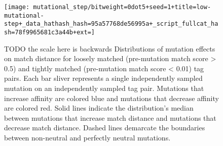 \begin{figure}
\begin{center}

\texttt{[image: mutational\_step/bitweight=0dot5+seed=1+title=low-mutational-step+\_data\_hathash\_hash=95a57768de56995a+\_script\_fullcat\_hash=78f9965681c3a44b+ext=]}
\caption{
TODO the scale here is backwards
Distributions of mutation effects on match distance for loosely matched (pre-mutation match score > 0.5) and tightly matched (pre-mutation match score < 0.01) tag pairs.
Each bar sliver represents a single independently sampled mutation on an independently sampled tag pair.
Mutations that increase affinity are colored blue and mutations that decrease affinity are colored red.
Solid lines indicate the distribution's median between mutations that increase match distance and mutations that decrease match distance.
Dashed lines demarcate the boundaries between non-neutral and perfectly neutral mutations.
}
\label{fig:mutational_step}

\end{center}
\end{figure}
